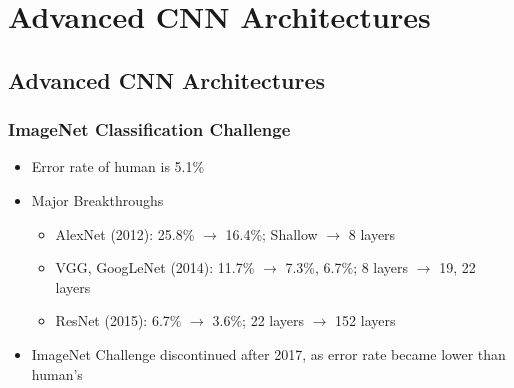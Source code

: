 \section{Advanced CNN Architectures}

\subsection{Advanced CNN Architectures}

\subsubsection*{ImageNet Classification Challenge}
\begin{itemize}
    \item Error rate of human is 5.1\%
    \item Major Breakthroughs
    \begin{itemize}
        \item AlexNet (2012): 25.8\% $\to$ 16.4\%; Shallow $\to$ 8 layers
        \item VGG, GoogLeNet (2014): 11.7\% $\to$ 7.3\%, 6.7\%; 8 layers $\to$ 19, 22 layers
        \item ResNet (2015): 6.7\% $\to$ 3.6\%; 22 layers $\to$ 152 layers
    \end{itemize}
    \item ImageNet Challenge discontinued after 2017, as error rate became lower than human's
\end{itemize}
\begin{figures}
\end{figures}

